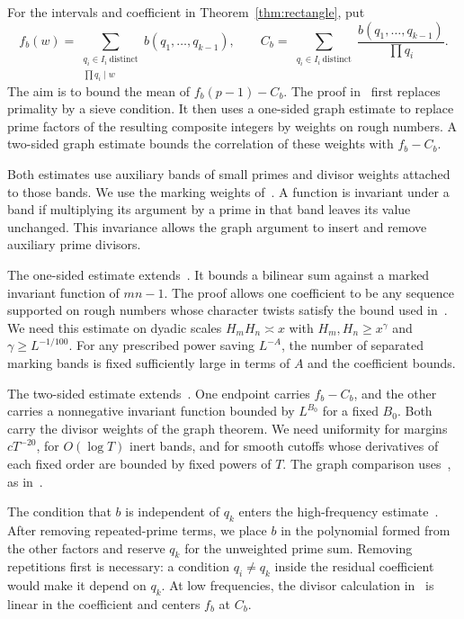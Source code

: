 \documentclass[10pt]{article}
\begin{document}
For the intervals and coefficient in Theorem~\ref{thm:rectangle}, put
\[
 f_b(w)=\sum_{\substack{q_i\in I_i\ \mathrm{distinct}\\
                       \prod q_i\mid w}}b(q_1,\ldots,q_{k-1}),
 \qquad
 C_b=\sum_{\substack{q_i\in I_i\ \mathrm{distinct}}}
          \frac{b(q_1,\ldots,q_{k-1})}{\prod q_i}.
\]
The aim is to bound the mean of $f_b(p-1)-C_b$. The proof in~\cite[Section~7]{PD} first replaces primality by a sieve condition. It then uses a one-sided graph estimate to replace prime factors of the resulting composite integers by weights on rough numbers. A two-sided graph estimate bounds the correlation of these weights with $f_b-C_b$.

Both estimates use auxiliary bands of small primes and divisor weights attached to those bands. We use the marking weights of~\cite[(3.4), Section~6]{PD}. A function is invariant under a band if multiplying its argument by a prime in that band leaves its value unchanged. This invariance allows the graph argument to insert and remove auxiliary prime divisors.

The one-sided estimate extends~\cite[Theorem~3.1]{PD}. It bounds a bilinear sum against a marked invariant function of $mn-1$. The proof allows one coefficient to be any sequence supported on rough numbers whose character twists satisfy the bound used in~\cite[Lemma~5.2]{PD}. We need this estimate on dyadic scales $H_mH_n\asymp x$ with $H_m,H_n\geq x^\gamma$ and $\gamma\geq L^{-1/100}$. For any prescribed power saving $L^{-A}$, the number of separated marking bands is fixed sufficiently large in terms of $A$ and the coefficient bounds.

The two-sided estimate extends~\cite[Theorem~6.1]{PD}. One endpoint carries $f_b-C_b$, and the other carries a nonnegative invariant function bounded by $L^{B_0}$ for a fixed $B_0$. Both carry the divisor weights of the graph theorem. We need uniformity for margins $cT^{-20}$, for $O(\log T)$ inert bands, and for smooth cutoffs whose derivatives of each fixed order are bounded by fixed powers of $T$. The graph comparison uses~\cite[Lemma~3.4, Theorem~3.5, Corollary~3.11, Theorem~4.1, Lemma~4.3]{WD}, as in~\cite[Propositions~6.2--6.3]{PD}.

The condition that $b$ is independent of $q_k$ enters the high-frequency estimate~\cite[(6.31)--(6.38)]{PD}. After removing repeated-prime terms, we place $b$ in the polynomial formed from the other factors and reserve $q_k$ for the unweighted prime sum. Removing repetitions first is necessary: a condition $q_i\ne q_k$ inside the residual coefficient would make it depend on $q_k$. At low frequencies, the divisor calculation in~\cite[Lemma~6.5]{PD} is linear in the coefficient and centers $f_b$ at $C_b$.
\end{document}
